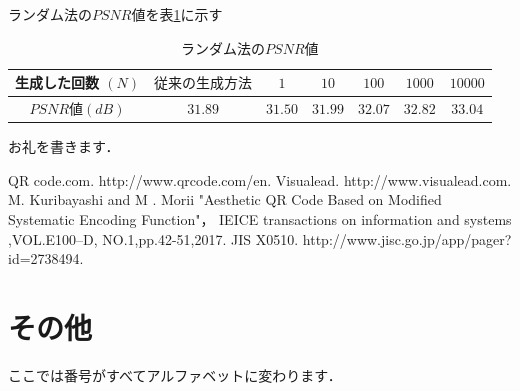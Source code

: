 \documentclass{thesis}
\begin{document}
ランダム法の$PSNR$値を表\ref{tab:PSNR}に示す

\begin{table}[H]
	\caption{ランダム法の$PSNR$値}
	\begin{center}
  		\begin{tabular}{|c|c|c|c|c|c|c|} \hline
     			生成した回数 $(N) $& $従来の生成方法$ & $1$ & $10$ & $100$ & $1000$ & $10000$  \\  \hline
   			$PSNR$値$(dB)$ & $31.89$& $31.50$ & $31.99$ & $32.07$ & $32.82$ & $33.04$\\ \hline
     		\end{tabular}
  	\end{center}
  \label{tab:PSNR}
\end{table}

\acknowledgement

お礼を書きます．

\begin{thebibliography}{99}

%
QR code.com. http://www.qrcode.com/en.
%
Visualead. http://www.visualead.com.
%
M. Kuribayashi and M . Morii "Aesthetic QR Code Based on Modified Systematic Encoding Function"，
IEICE transactions on information and systems ,VOL.E100–D, NO.1,pp.42-51,2017.
%
JIS X0510. http://www.jisc.go.jp/app/pager?id=2738494. 
\end{thebibliography}

\appendix

\chapter{その他}

ここでは番号がすべてアルファベットに変わります．
\end{document}
